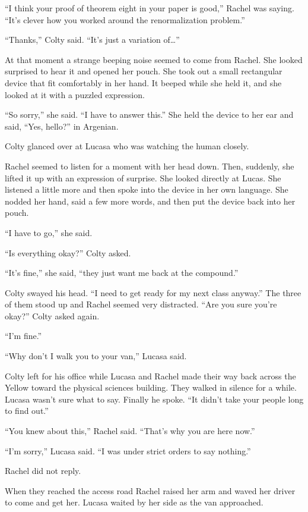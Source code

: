 ``I think your proof of theorem eight in your paper is good,'' Rachel was saying. ``It's clever
how you worked around the renormalization problem.''

``Thanks,'' Colty said. ``It's just a variation of\ldots''

At that moment a strange beeping noise seemed to come from Rachel. She looked surprised to hear
it and opened her pouch. She took out a small rectangular device that fit comfortably in her
hand. It beeped while she held it, and she looked at it with a puzzled expression.

``So sorry,'' she said. ``I have to answer this.'' She held the device to her ear and said,
``Yes, hello?'' in Argenian.

Colty glanced over at Lucasa who was watching the human closely.

Rachel seemed to listen for a moment with her head down. Then, suddenly, she lifted it up with
an expression of surprise. She looked directly at Lucas. She listened a little more and then
spoke into the device in her own language. She nodded her hand, said a few more words, and then
put the device back into her pouch.

``I have to go,'' she said.

``Is everything okay?'' Colty asked.

``It's fine,'' she said, ``they just want me back at the compound.''

Colty swayed his head. ``I need to get ready for my next class anyway.'' The three of them stood
up and Rachel seemed very distracted. ``Are you sure you're okay?'' Colty asked again.

``I'm fine.''

``Why don't I walk you to your van,'' Lucasa said.

Colty left for his office while Lucasa and Rachel made their way back across the Yellow toward
the physical sciences building. They walked in silence for a while. Lucasa wasn't sure what to
say. Finally he spoke. ``It didn't take your people long to find out.''

``You knew about this,'' Rachel said. ``That's why you are here now.''

``I'm sorry,'' Lucasa said. ``I was under strict orders to say nothing.''

Rachel did not reply.

When they reached the access road Rachel raised her arm and waved her driver to come and get
her. Lucasa waited by her side as the van approached.

